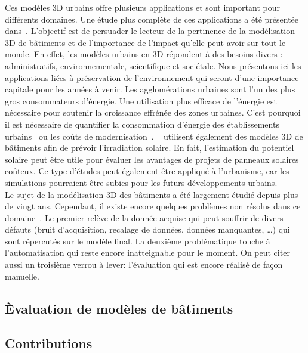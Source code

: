         Ces modèles 3D urbains offre plusieurs applications et sont important pour différents domaines.
        Une étude plus complète de ces applications a été présentée dans~\parencite{biljecki2015applications}.
        L'objectif est de persuader le lecteur de la pertinence de la modélisation 3D de bâtiments et de l'importance de l'impact qu'elle peut avoir sur tout le monde.
        En effet, les modèles urbains en 3D répondent à des besoins divers : administratifs, environnementale, scientifique et sociétale.
        Nous présentons ici les applications liées à préservation de l'environnement qui seront d'une importance capitale pour les années à venir.
        Les agglomérations urbaines sont l'un des plus gros consommateurs d'énergie.
        Une utilisation plus efficace de l'énergie est nécessaire pour soutenir la croissance effrénée des zones urbaines.
        C'est pourquoi il est nécessaire de quantifier la consommation d'énergie des établissements urbains~\parencite{wate20153d} ou les coûts de modernisation~\parencite{previtali2014automatic}.
        ~\textcite{biljecki2015propagation} utilisent également des modèles 3D de bâtiments afin de prévoir l'irradiation solaire.
        En fait, l'estimation du potentiel solaire peut être utile pour évaluer les avantages de projets de panneaux solaires coûteux.
        Ce type d'études peut également être appliqué à l'urbanisme, car les simulations pourraient être subies pour les futurs développements urbains.\\

        Le sujet de la modélisation 3D des bâtiments a été largement étudié depuis plus de vingt ans.
        Cependant, il existe encore quelques problèmes non résolus dans ce domaine~\parencite{musialski2013survey,lafarge2015some}.
        Le premier relève de la donnée acquise qui peut souffrir de divers défauts (bruit d'acquisition, recalage de données, données manquantes, \dots) qui sont répercutés sur le modèle final.
        La deuxième problématique touche à l'automatisation qui reste encore inatteignable pour le moment.
        On peut citer aussi un troisième verrou à lever: l'évaluation qui est encore réalisé de façon manuelle.

    \subsection*{\`Evaluation de modèles de bâtiments}

    \subsection*{Contributions}

